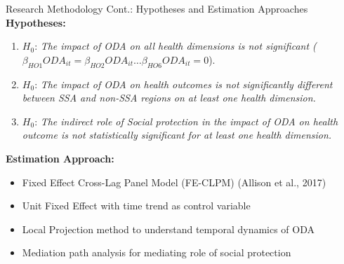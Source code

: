 \documentclass[aspectratio=169,handout, 10pt]{beamer}
\begin{document}
\begin{frame}{Research Methodology Cont.: Hypotheses and Estimation Approaches}
    \textbf{Hypotheses:}
    \begin{enumerate}[i]
        \item $H_0$: \textit{The impact of ODA on all health dimensions is not significant ($\beta_{HO1} ODA_{it} = \beta_{HO2} ODA_{it} \dots \beta_{HO6} ODA_{it} = 0$}).
        \item $H_0$: \textit{The impact of ODA on health outcomes is not significantly different between SSA and non-SSA regions on at least one health dimension.}
        \item $H_0$: \textit{The indirect role of Social protection in the impact of ODA on health outcome is not statistically significant for at least one health dimension.}
    \end{enumerate}
    \textbf{Estimation Approach:}\\
\begin{itemize}
    \item Fixed Effect Cross-Lag Panel Model (FE-CLPM) (Allison et al., 2017)
    \item Unit Fixed Effect with time trend as control variable
    \item Local Projection method to understand temporal dynamics of ODA    
    \item Mediation path analysis for mediating role of social protection
\end{itemize}
\end{frame}
\end{document}
